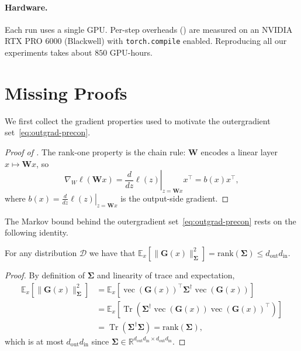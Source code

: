 \documentclass{article}
\renewcommand{\vec}{\operatorname{vec}}
\newcommand{\mat}[1]{\bm{#1}}
\newcommand{\cD}{\mathcal{D}}
\newcommand{\R}{\mathbb{R}}
\newcommand{\EE}[2]{\mathbb{E}_{#1}\left[#2\right] }
\DeclareMathOperator{\Tr}{Tr}
\begin{document}
\paragraph{Hardware.} Each run uses a single GPU. Per-step overheads () are measured on an NVIDIA RTX PRO 6000 (Blackwell) with \texttt{torch.compile} enabled. Reproducing all our experiments takes about $850$ GPU-hours.

\newpage



\section{Missing Proofs}
\label{app:proofs}



We first collect the gradient properties used to motivate the outergradient set~\eqref{eq:outgrad-precon}.
\gradprop*
\begin{proof}[Proof of ]
The rank-one property is the chain rule: $\mat{W}$ encodes a linear layer
$x \mapsto \mat{W} x$, so
\[
\nabla_W \ell(\mat{W}x) =  \left. \frac{d }{dz} \ell(z)
\right|_{z =\mat{W}x} x^\top
=b(x)x^\top,
\]
where $b(x) = \left.\frac{d }{dz} \ell(z)  \right|_{z =\mat{W}x}$ is the output-side gradient.
\end{proof}

The Markov bound behind the outergradient set~\eqref{eq:outgrad-precon} rests on the following identity.
\begin{lemma}\label{lem:expectation}
For any distribution $\cD$ we have that $\displaystyle \EE{x}{\|\mat{G}(x)\|_{\mat{\Sigma}}^2} = \mathrm{rank}(\mat{\Sigma}) \le d_{\mathrm{out}} d_{\mathrm{in}}.$
\end{lemma}
\begin{proof}
By definition of $\mat{\Sigma}$ and linearity of trace and expectation,
\begin{align*}
 \EE{x}{\|\mat{G}(x)\|_{\mat{\Sigma}}^2} 
 &= \EE{x}{\vec(\mat{G}(x))^\top \mat{\Sigma}^\dagger \vec(\mat{G}(x))}  \\
 &= \EE{x}{\Tr(\mat{\Sigma}^\dagger \vec(\mat{G}(x))\vec(\mat{G}(x))^\top)}  \\
 &= \Tr(\mat{\Sigma}^\dagger \mat{\Sigma}) = \mathrm{rank}(\mat{\Sigma}),
 \end{align*}
which is at most $d_{\mathrm{out}} d_{\mathrm{in}}$ since $\mat{\Sigma} \in \R^{d_{\mathrm{out}} d_{\mathrm{in}}\times d_{\mathrm{out}} d_{\mathrm{in}}}$.
\end{proof}
\end{document}
